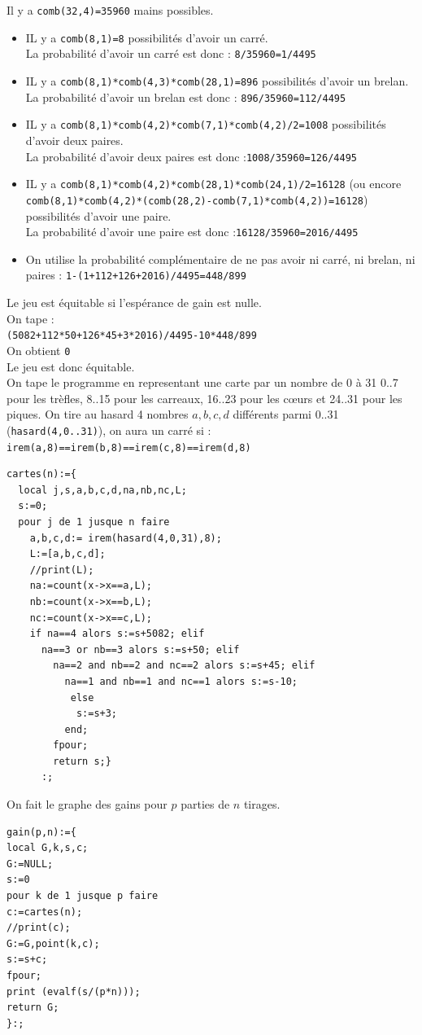 \documentclass[a4paper,11pt]{book}
\begin{document}
Il y a {\tt comb(32,4)=35960} mains possibles.\\
\begin{itemize}
\item IL y a {\tt comb(8,1)=8}  possibilit\'es d'avoir un carr\'e.\\
La probabilit\'e d'avoir un carr\'e est donc : {\tt 8/35960=1/4495}
\item IL y a {\tt comb(8,1)*comb(4,3)*comb(28,1)=896} possibilit\'es d'avoir 
un brelan.\\
La probabilit\'e d'avoir un brelan est donc : {\tt 896/35960=112/4495}
\item IL y a {\tt comb(8,1)*comb(4,2)*comb(7,1)*comb(4,2)/2=1008} 
possibilit\'es d'avoir deux paires.\\
La probabilit\'e d'avoir deux paires est donc :{\tt 1008/35960=126/4495}
\item IL y a {\tt comb(8,1)*comb(4,2)*comb(28,1)*comb(24,1)/2=16128} (ou encore {\tt comb(8,1)*comb(4,2)*(comb(28,2)-comb(7,1)*comb(4,2))=16128}) possibilit\'es d'avoir une paire.\\
La probabilit\'e d'avoir une paire est donc :{\tt 16128/35960=2016/4495}
\item On utilise la probabilit\'e compl\'ementaire de ne pas avoir ni carr\'e,
 ni  brelan, ni paires : {\tt 1-(1+112+126+2016)/4495=448/899}
\end{itemize}
Le jeu est \'equitable si l'esp\'erance de gain est nulle.\\
 On tape :\\
{\tt (5082+112*50+126*45+3*2016)/4495-10*448/899}\\
On obtient {\tt 0}\\
Le jeu est donc \'equitable.\\
On tape le programme en representant une carte par un nombre de 0 \`a 31
0..7 pour les tr\`efles, 8..15 pour les carreaux, 16..23 pour les c{\oe}urs et
24..31 pour les piques. On tire au hasard 4 nombres $a,b,c,d$ diff\'erents 
parmi 0..31 ({\tt hasard(4,0..31)}), on aura un carr\'e si :\\
{\tt irem(a,8)==irem(b,8)==irem(c,8)==irem(d,8)}
\begin{verbatim}
cartes(n):={
  local j,s,a,b,c,d,na,nb,nc,L;
  s:=0;
  pour j de 1 jusque n faire
    a,b,c,d:= irem(hasard(4,0,31),8);
    L:=[a,b,c,d];
    //print(L);
    na:=count(x->x==a,L);
    nb:=count(x->x==b,L);
    nc:=count(x->x==c,L);
    if na==4 alors s:=s+5082; elif
      na==3 or nb==3 alors s:=s+50; elif
        na==2 and nb==2 and nc==2 alors s:=s+45; elif
          na==1 and nb==1 and nc==1 alors s:=s-10; 
           else 
            s:=s+3;
          end;
        fpour;
        return s;}
      :;
\end{verbatim}
On fait le graphe des gains pour $p$ parties de $n$ tirages.
\begin{verbatim}
gain(p,n):={
local G,k,s,c;
G:=NULL;
s:=0
pour k de 1 jusque p faire
c:=cartes(n);
//print(c);
G:=G,point(k,c);
s:=s+c;
fpour;
print (evalf(s/(p*n)));
return G;
}:;
\end{verbatim}
\end{document}
